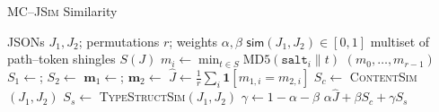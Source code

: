 \documentclass[sigconf]{acmart}
\begin{document}
\begin{algorithm}[t]
  \caption{\textsc{MC--JSim} Similarity}
  \label{alg:mc-jsim}
  \begin{algorithmic}[1]
    \Require JSONs $J_{1},J_{2}$; permutations $r$; weights $\alpha,\beta$
    \Ensure  $\mathsf{sim}(J_{1},J_{2})\in[0,1]$
       \State \Return multiset of path–token shingles \(S(J)\)
    \EndFunction
          \State $m_{i}\gets\min_{t\in S}\text{MD5}(\texttt{salt}_{i}\|t)$
       \EndFor
       \State \Return $(m_{0},\dots ,m_{r-1})$
    \EndFunction
       \State $S_{1}\gets$;
              $S_{2}\gets$
       \State $\mathbf m_{1}\gets$;
              $\mathbf m_{2}\gets$
       \State $\widehat{J}\gets\frac{1}{r}\sum_{i}\mathbf1[m_{1,i}=m_{2,i}]$
       \State $S_{c}\gets$ \textsc{ContentSim}$(J_{1},J_{2})$
       \State $S_{s}\gets$ \textsc{TypeStructSim}$(J_{1},J_{2})$
       \State $\gamma\gets1-\alpha-\beta$
       \State \Return $\alpha\widehat{J}+\beta S_{c}+\gamma S_{s}$
    \EndFunction
  \end{algorithmic}
\end{algorithm}
\end{document}
